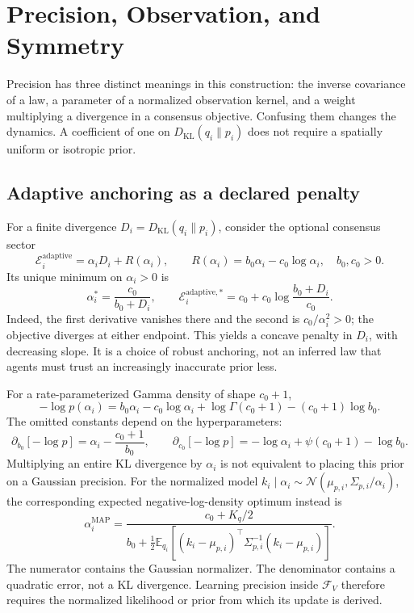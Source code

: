 \section{Precision, Observation, and Symmetry}\label{sec:precision_envelope}

Precision has three distinct meanings in this construction: the inverse covariance of a law, a parameter of a normalized observation kernel, and a weight multiplying a divergence in a consensus objective. Confusing them changes the dynamics. A coefficient of one on $D_{\mathrm{KL}}(q_i\|p_i)$ does not require a spatially uniform or isotropic prior.

\subsection{Adaptive anchoring as a declared penalty}\label{sec:state_dependent_precision}
For a finite divergence $D_i=D_{\mathrm{KL}}(q_i\|p_i)$, consider the optional consensus sector
\begin{equation}
\mathcal E_i^{\mathrm{adaptive}}=\alpha_iD_i+R(\alpha_i),
\qquad R(\alpha_i)=b_0\alpha_i-c_0\log\alpha_i,
\quad b_0,c_0>0.
\label{eq:free_energy_adaptive}
\end{equation}
Its unique minimum on $\alpha_i>0$ is
\begin{equation}
\alpha_i^*=\frac{c_0}{b_0+D_i},\qquad
\mathcal E_i^{\mathrm{adaptive},*}
=c_0+c_0\log\frac{b_0+D_i}{c_0}.
\label{eq:state_dependent_alpha}
\end{equation}
Indeed, the first derivative vanishes there and the second is $c_0/\alpha_i^2>0$; the objective diverges at either endpoint. This yields a concave penalty in $D_i$, with decreasing slope. It is a choice of robust anchoring, not an inferred law that agents must trust an increasingly inaccurate prior less.

For a rate-parameterized Gamma density of shape $c_0+1$,
\begin{equation}
-\log p(\alpha_i)
=b_0\alpha_i-c_0\log\alpha_i+
\log\Gamma(c_0+1)-(c_0+1)\log b_0.
\label{eq:precision_gamma_normalized}
\end{equation}
The omitted constants depend on the hyperparameters:
\begin{equation}
\partial_{b_0}[-\log p]=\alpha_i-\frac{c_0+1}{b_0},
\qquad
\partial_{c_0}[-\log p]=-\log\alpha_i+\psi(c_0+1)-\log b_0.
\label{eq:precision_gamma_hyper_derivatives}
\end{equation}
Multiplying an entire KL divergence by $\alpha_i$ is not equivalent to placing this prior on a Gaussian precision. For the normalized model
$k_i\mid\alpha_i\sim\mathcal N(\mu_{p,i},\Sigma_{p,i}/\alpha_i)$,
the corresponding expected negative-log-density optimum instead is
\begin{equation}
\alpha_i^{\mathrm{MAP}}
=\frac{c_0+K_q/2}{b_0+\frac12\mathbb E_{q_i}
[(k_i-\mu_{p,i})^\top\Sigma_{p,i}^{-1}(k_i-\mu_{p,i})]}.
\end{equation}
The numerator contains the Gaussian normalizer. The denominator contains a quadratic error, not a KL divergence. Learning precision inside $\mathcal F_V$ therefore requires the normalized likelihood or prior from which its update is derived.

